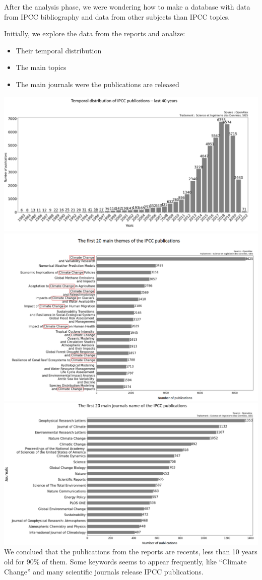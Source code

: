 \documentclass[
]{article}
\providecommand{\tightlist}{%
  \setlength{\itemsep}{0pt}\setlength{\parskip}{0pt}}
\begin{document}
After the analysis phase, we were wondering how to make a database with
data from IPCC bibliography and data from other subjects than IPCC
topics.

Initially, we explore the data from the reports and analize:

\begin{itemize}
\tightlist
\item
  Their temporal distribution
\item
  The main topics
\item
  The main journals were the publications are released
\end{itemize}

\includegraphics{./images/time_distribution_IPCC_model.png}
\includegraphics{./images/topics_distribution_IPCC_model_fr.png}
\includegraphics{./images/locations_distribution_IPCC_model.png} We
conclued that the publications from the reports are recents, less than
10 years old for 90\% of them. Some keywords seems to appear frequently,
like ``Climate Change'' and many scientific journals release IPCC
publications.
\end{document}
